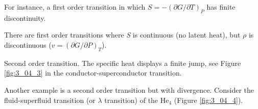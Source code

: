 \documentclass[../main/main.tex]{subfiles}
\begin{document}
\begin{example}{}{}
For instance, a first order transition in which \( S=-(\partial{G}/\partial{T}  )_P \) has finite discontinuity.
\end{example}
\begin{remark}
There are first order transitions where \emph{S} is continuous (no latent heat), but \( \rho  \) is discontinuous (\( v = (\partial{G}/\partial{P}  )_T \)).
\end{remark}
\begin{example}{}{}
Second order transition. The specific heat displays a finite jump, see Figure \ref{fig:3_04_3} in the conductor-superconductor transition.

Another example is a second order transition but with divergence. Consider the fluid-superfluid transition (or \( \lambda  \) transition) of the \( \text{He}_4 \) (Figure \ref{fig:3_04_4}).
\end{example}
\end{document}
